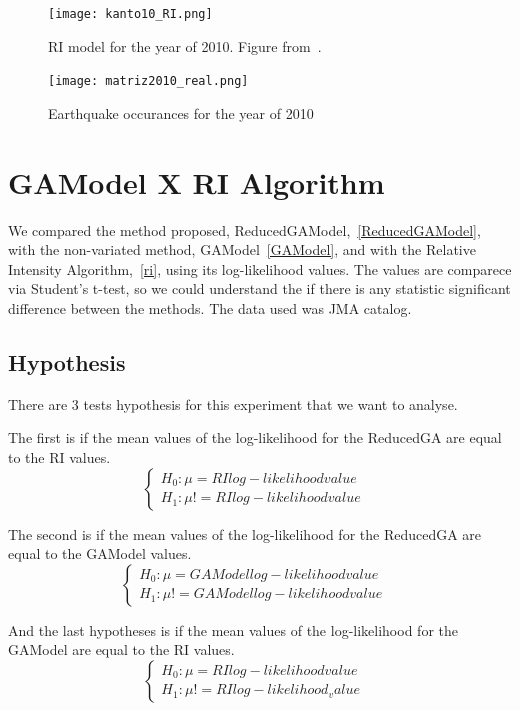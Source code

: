 \begin{figure}[H]
\centering
\texttt{[image: kanto10\_RI.png]}
\caption{RI model for the year of 2010. Figure from~\cite{ecta14}.}
\label{modeloRI}
\end{figure}

\begin{figure}[H]
\centering
\texttt{[image: matriz2010\_real.png]}
\caption{Earthquake occurances for the year of 2010}
\label{realData}
\end{figure}



\section{GAModel X RI Algorithm}
We compared the method proposed, ReducedGAModel,~\ref{ReducedGAModel}, with the non-variated method, GAModel~\ref{GAModel}, and with the Relative Intensity Algorithm,~\ref{ri}, using its log-likelihood values. The values are comparece via Student’s t-test, so we could understand the if there is any statistic significant difference between the methods. The data used was JMA catalog. 


\subsection{Hypothesis}
There are 3 tests hypothesis for this experiment that we want to analyse. 

The first is if the mean values of the log-likelihood for the ReducedGA are equal to the RI values.
$$\begin{cases} H_0: \mu = RI log-likelihood value&\\H_1: \mu != RI log-likelihood value\end{cases}$$

The second is if the mean values of the log-likelihood for the ReducedGA are equal to the GAModel values.
$$\begin{cases} H_0: \mu = GAModel log-likelihood value&\\H_1: \mu != GAModel log-likelihood value\end{cases}$$

And the last hypotheses is if the mean values of the log-likelihood for the GAModel are equal to the RI values.
$$\begin{cases} H_0: \mu = RI log-likelihood value&\\H_1: \mu != RI log-likelihood_value\end{cases}$$


